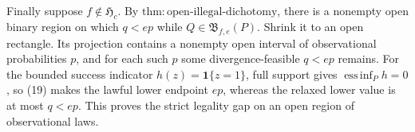 Finally suppose \(f\notin\mathfrak H_c\).  By \(\mathrm{thm:open\text{-}illegal\text{-}dichotomy}\), there is a nonempty open binary region on which \(q<ep\) while \(Q\in\mathfrak B_{f,e}(P)\).  Shrink it to an open rectangle.  Its projection contains a nonempty open interval of observational probabilities \(p\), and for each such \(p\) some divergence-feasible \(q<ep\) remains.  For the bounded success indicator \(h(z)=\mathbf 1\{z=1\}\), full support gives \(\operatorname*{ess\,inf}_P h=0\), so (19) makes the lawful lower endpoint \(ep\), whereas the relaxed lower value is at most \(q<ep\).  This proves the strict legality gap on an open region of observational laws.
